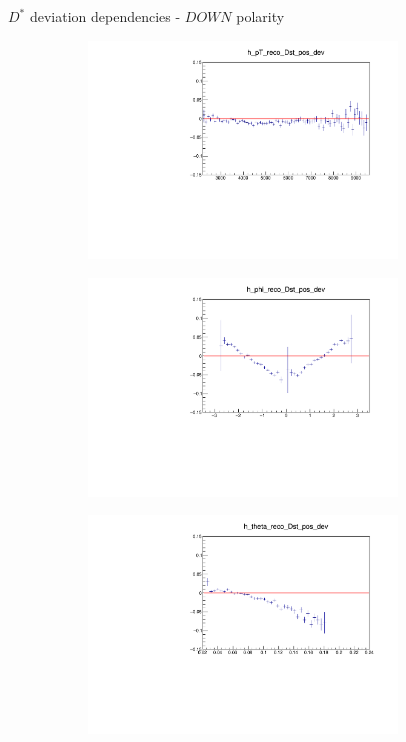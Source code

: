 \documentclass[11pt]{beamer}
\begin{document}
\begin{frame}{$D^*$ deviation dependencies - $DOWN$ polarity}
\begin{figure}
\begin{subfigure}{0.45\textwidth}
\includegraphics[width=0.9\textwidth]{down_pdf/deviation/h_pt_reco_Dst_pos_dev.pdf}
\end{subfigure}
\begin{subfigure}{0.45\textwidth}
\includegraphics[width=0.9\textwidth]{down_pdf/deviation/h_phi_reco_Dst_pos_dev.pdf}
\end{subfigure}
\begin{subfigure}{0.45\textwidth}
\includegraphics[width=0.9\textwidth]{down_pdf/deviation/h_theta_reco_Dst_pos_dev.pdf}

\end{subfigure}
\end{figure}
\end{frame}
\end{document}
